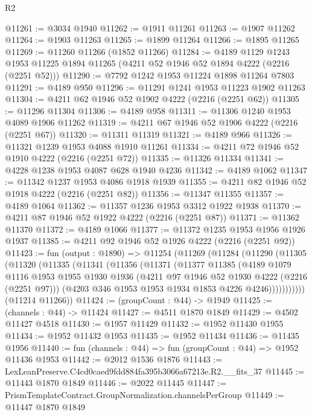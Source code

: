 \begin{lexlean}{R2}
\begin{coremodule}
@11261 := @3034 @1940
@11262 := @1911 @11261
@11263 := @1907 @11262
@11264 := @1903 @11263
@11265 := @1899 @11264
@11266 := @1895 @11265
@11269 := @11260 @11266 (@1852 @11266)
@11284 := @4189
    @1129
    @1243
    @1953
    @11225
    @1894
    @11265
    (@4211 @52 @1946 @52 @1894 @4222 (@2216 (@2251 @52)))
@11290 := @7792 @1242 @1953 @11224 @1898 @11264 @7803
@11291 := @4189 @950
@11296 := @11291 @1241 @1953 @11223 @1902 @11263
@11304 := @4211 @62 @1946 @52 @1902 @4222 (@2216 (@2251 @62))
@11305 := @11296 @11304
@11306 := @4189 @958
@11311 := @11306 @1240 @1953 @4089 @1906 @11262
@11319 := @4211 @67 @1946 @52 @1906 @4222 (@2216 (@2251 @67))
@11320 := @11311 @11319
@11321 := @4189 @966
@11326 := @11321 @1239 @1953 @4088 @1910 @11261
@11334 := @4211 @72 @1946 @52 @1910 @4222 (@2216 (@2251 @72))
@11335 := @11326 @11334
@11341 := @4228 @1238 @1953 @4087 @628 @1940 @4236
@11342 := @4189 @1062
@11347 := @11342 @1237 @1953 @4086 @1918 @1939
@11355 := @4211 @82 @1946 @52 @1918 @4222 (@2216 (@2251 @82))
@11356 := @11347 @11355
@11357 := @4189 @1064
@11362 := @11357 @1236 @1953 @3312 @1922 @1938
@11370 := @4211 @87 @1946 @52 @1922 @4222 (@2216 (@2251 @87))
@11371 := @11362 @11370
@11372 := @4189 @1066
@11377 := @11372 @1235 @1953 @1956 @1926 @1937
@11385 := @4211 @92 @1946 @52 @1926 @4222 (@2216 (@2251 @92))
@11423 := fun (output : @1890) =>
  @11254
    (@11269
      (@11284
        (@11290
          (@11305
            (@11320
              (@11335
                (@11341
                  (@11356
                    (@11371
                      (@11377
                        @11385
                        (@4189
                          @1079
                          @1116
                          @1953
                          @1955
                          @1930
                          @1936
                          (@4211 @97 @1946 @52 @1930 @4222 (@2216 (@2251 @97)))
                          (@4203 @346 @1953 @1953 @1934 @1853 @4226 @4246)))))))))))
      (@11214 @11266))
@11424 := (groupCount : @44) -> @1949
@11425 := (channels : @44) -> @11424
@11427 := @4511 @1870 @1849
@11429 := @4502 @11427 @4518
@11430 := @1957 @11429
@11432 := @1952 @11430 @1955
@11434 := @1952 @11432 @1953
@11435 := @1952 @11434
@11436 := @11435 @1956
@11440 := fun (channels : @44) => fun (groupCount : @44) => @1952 @11436 @1953
@11442 := @2012 @1536 @1876
@11443 := LexLeanPreserve.C4cd0caed9fdd884fa395b3066a67213e.R2.__fits_37
@11445 := @11443 @1870 @1849
@11446 := @2022 @11445
@11447 := PrismTemplateContract.GroupNormalization.channelsPerGroup
@11449 := @11447 @1870 @1849

\end{coremodule}
\end{lexlean}
